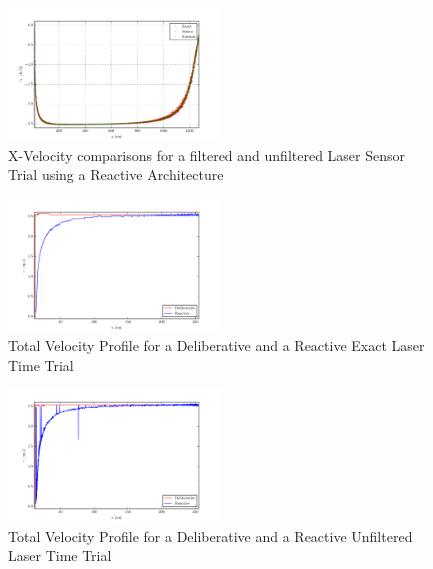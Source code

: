 \documentclass[journal, 10pt]{IEEEtran}
\begin{document}
\begin{figure}[tb]
\begin{center}
\includegraphics[width=0.5\textwidth]{figures/reactivelaservx.pdf}
\caption{X-Velocity comparisons for a filtered and unfiltered Laser Sensor Trial using a Reactive Architecture }
\label{xNoise_velocity}
\end{center}
\end{figure}

\begin{figure}[tb]
\begin{center}
\includegraphics[width=0.5\textwidth]{figures/TotalVelocityClean.pdf}
\caption{Total Velocity Profile for a Deliberative and a Reactive Exact Laser Time Trial }
\label{clean_total}
\end{center}
\end{figure}

\begin{figure}[tb]
\begin{center}
\includegraphics[width=0.5\textwidth]{figures/TotalVelocityNoisy.pdf}
\caption{Total Velocity Profile for a Deliberative and a Reactive Unfiltered Laser Time Trial }
\label{noisy_total}
\end{center}
\end{figure}
\end{document}
